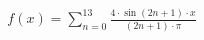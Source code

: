 \documentclass[preview]{standalone}
\begin{document}
\begin{align*}
f(x) = \sum_{n=0}^{13} \frac{4 \cdot \sin (2n + 1) \cdot x }{ (2n + 1) \cdot \pi}
\end{align*}
\end{document}
